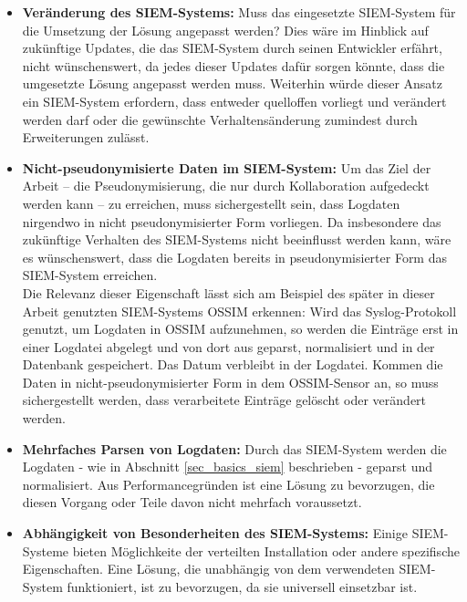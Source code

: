 \begin{itemize}

  \item \textbf{Veränderung des SIEM-Systems: } Muss das eingesetzte SIEM-System für die Umsetzung der Lösung angepasst werden? Dies wäre im Hinblick auf zukünftige Updates, die das SIEM-System durch seinen Entwickler erfährt, nicht wünschenswert, da jedes dieser Updates dafür sorgen könnte, dass die umgesetzte Lösung angepasst werden muss. Weiterhin würde dieser Ansatz ein SIEM-System erfordern, dass entweder quelloffen vorliegt und verändert werden darf oder die gewünschte Verhaltensänderung zumindest durch Erweiterungen zulässt. 
  
  \item \textbf{Nicht-pseudonymisierte Daten im SIEM-System: } Um das Ziel der Arbeit -- die Pseudonymisierung, die nur durch Kollaboration aufgedeckt werden kann -- zu erreichen, muss sichergestellt sein, dass Logdaten nirgendwo in nicht pseudonymisierter Form vorliegen. Da insbesondere das zukünftige Verhalten des SIEM-Systems nicht beeinflusst werden kann, wäre es wünschenswert, dass die Logdaten bereits in pseudonymisierter Form das SIEM-System erreichen.\\
  Die Relevanz dieser Eigenschaft lässt sich am Beispiel des später in dieser Arbeit genutzten SIEM-Systems OSSIM erkennen: Wird das Syslog-Protokoll genutzt, um Logdaten in OSSIM aufzunehmen, so werden die Einträge erst in einer Logdatei abgelegt und von dort aus geparst, normalisiert und in der Datenbank gespeichert. Das Datum verbleibt in der Logdatei. Kommen die Daten in nicht-pseudonymisierter Form in dem OSSIM-Sensor an, so muss sichergestellt werden, dass verarbeitete Einträge gelöscht oder verändert werden.
  
  \item \textbf{Mehrfaches Parsen von Logdaten: } Durch das SIEM-System werden die Logdaten - wie in Abschnitt \ref{sec_basics_siem} beschrieben - geparst und normalisiert. Aus Performancegründen ist eine Lösung zu bevorzugen, die diesen Vorgang oder Teile davon nicht mehrfach voraussetzt.
  
  \item \textbf{Abhängigkeit von Besonderheiten des SIEM-Systems: } Einige SIEM-Systeme bieten Möglichkeite der verteilten Installation oder andere spezifische Eigenschaften. Eine Lösung, die unabhängig von dem verwendeten SIEM-System funktioniert, ist zu bevorzugen, da sie universell einsetzbar ist.    
  

\end{itemize}

